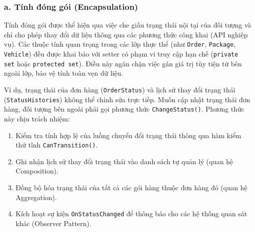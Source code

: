 \documentclass[12pt,a4paper]{article}
\begin{document}
\subsubsection*{a. Tính đóng gói (Encapsulation)}

Tính đóng gói được thể hiện qua việc che giấu trạng thái nội tại của đối tượng và chỉ cho phép thay đổi dữ liệu thông qua các phương thức công khai (API nghiệp vụ). Các thuộc tính quan trọng trong các lớp thực thể (như \texttt{Order}, \texttt{Package}, \texttt{Vehicle}) đều được khai báo với setter có phạm vi truy cập hạn chế (\texttt{private set} hoặc \texttt{protected set}). Điều này ngăn chặn việc gán giá trị tùy tiện từ bên ngoài lớp, bảo vệ tính toàn vẹn dữ liệu.

Ví dụ, trạng thái của đơn hàng (\texttt{OrderStatus}) và lịch sử thay đổi trạng thái (\texttt{StatusHistories}) không thể chỉnh sửa trực tiếp. Muốn cập nhật trạng thái đơn hàng, đối tượng bên ngoài phải gọi phương thức \texttt{ChangeStatus()}. Phương thức này chịu trách nhiệm:
\begin{enumerate}[label=\arabic*.]
    \item Kiểm tra tính hợp lệ của luồng chuyển đổi trạng thái thông qua hàm kiểm thử tĩnh \texttt{CanTransition()}.
    \item Ghi nhận lịch sử thay đổi trạng thái vào danh sách tự quản lý (quan hệ Composition).
    \item Đồng bộ hóa trạng thái của tất cả các gói hàng thuộc đơn hàng đó (quan hệ Aggregation).
    \item Kích hoạt sự kiện \texttt{OnStatusChanged} để thông báo cho các hệ thống quan sát khác (Observer Pattern).
\end{enumerate}
\end{document}

